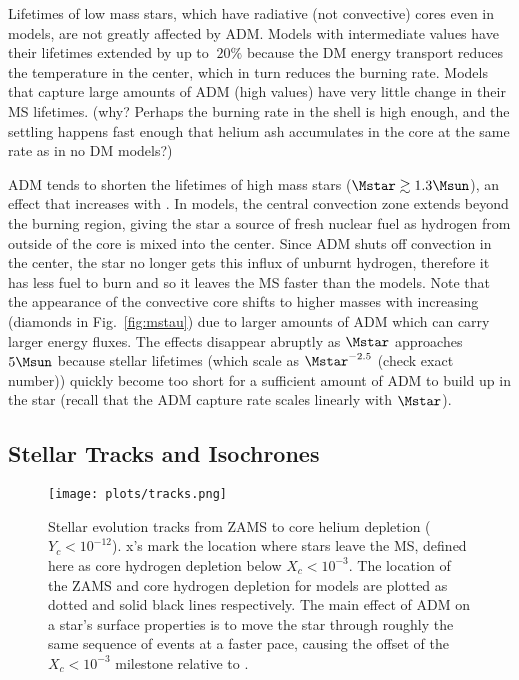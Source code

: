 Lifetimes of low mass stars, which have radiative (not convective) cores even in \nodm models, are not greatly affected by ADM. Models with intermediate \gammaB values have their lifetimes extended by up to $~20\%$ because the DM energy transport reduces the temperature in the center, which in turn reduces the burning rate. Models that capture large amounts of ADM (high \gammaB values) have very little change in their MS lifetimes. (why? Perhaps the burning rate in the shell is high enough, and the settling happens fast enough that helium ash accumulates in the core at the same rate as in no DM models?)

ADM tends to shorten the lifetimes of high mass stars ($\Mstar \gtrsim 1.3 \Msun$), an effect that increases with \gammaB. In \nodm models, the central convection zone extends beyond the burning region, giving the star a source of fresh nuclear fuel as hydrogen from outside of the core is mixed into the center. Since ADM shuts off convection in the center, the star no longer gets this influx of unburnt hydrogen, therefore it has less fuel to burn and so it leaves the MS faster than the \nodm models. Note that the appearance of the convective core shifts to higher masses with increasing \gammaB (diamonds in Fig.~\ref{fig:mstau}) due to larger amounts of ADM which can carry larger energy fluxes. The effects disappear abruptly as $\Mstar$ approaches $5 \Msun$ because stellar lifetimes (which scale as $\Mstar^{-2.5}$ (check exact number)) quickly become too short for a sufficient amount of ADM to build up in the star (recall that the ADM capture rate scales linearly with $\Mstar$).


\subsection{Stellar Tracks and Isochrones}
\label{sub:isochrones}

\begin{figure*}
  \centering
  \texttt{[image: plots/tracks.png]}
  \caption{
  Stellar evolution tracks from ZAMS to core helium depletion ($Y_c<10^{-12}$). x's mark the location where stars leave the MS, defined here as core hydrogen depletion below $X_c<10^{-3}$. The location of the ZAMS and core hydrogen depletion for \nodm models are plotted as dotted and solid black lines respectively. The main effect of ADM on a star's surface properties is to move the star through roughly the same sequence of events at a faster pace, causing the offset of the $X_c<10^{-3}$ milestone relative to \nodm.
  }
  \label{fig:tracks}

\end{figure*}

